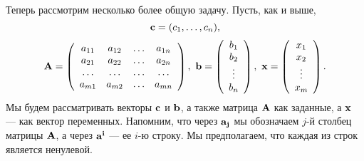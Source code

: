     Теперь рассмотрим несколько более общую задачу.
Пусть, как и выше,
\[\mathbf{c}=(c_{1},\ldots,c_{n}),\]
\[\mathbf{A}=\left(
\begin{array}{cccc}
   a_{11} & a_{12} & \ldots & a_{1n} \\
   a_{21} & a_{22} & \ldots & a_{2n} \\
   \ldots& \ldots &\ldots &\ldots \\
   a_{m1} & a_{m2} & \ldots & a_{mn}
\end{array}
\right), \ \mathbf{b}=\left(
     \begin{array}{c}
        b_{1} \\
        b_{2} \\
        \vdots \\
        b_{n}  \\
      \end{array}
    \right),\ \mathbf{x}=\left(
     \begin{array}{c}
        x_{1} \\
        x_{2} \\
        \vdots \\
        x_{m}  \\
      \end{array}
    \right).\]
    Мы будем рассматривать векторы $\mathbf{c}$ и $\mathbf{b}$, а также
    матрица $\mathbf{A}$ как заданные, а $\mathbf{x}$ --- как вектор
    переменных.
    Напомним, что через $\mathbf{a_{j}}$ мы обозначаем $j$-й столбец
    матрицы $\mathbf{A}$, а через $\mathbf{a^{i}}$ --- ее $i$-ю строку. Мы
    предполагаем, что каждая из строк является ненулевой.

